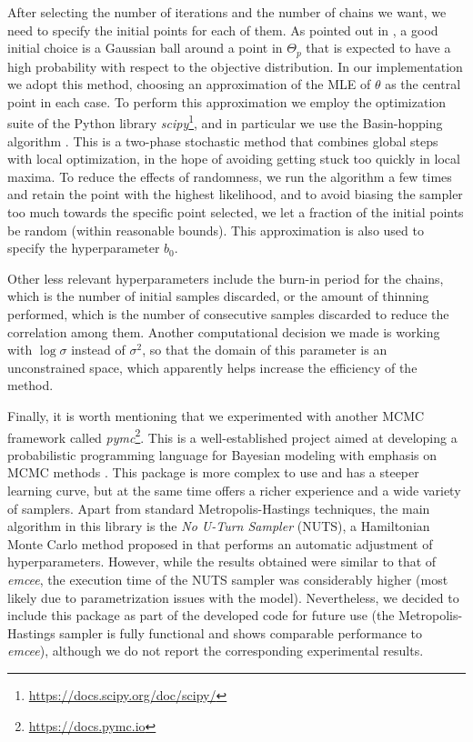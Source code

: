 After selecting the number of iterations and the number of chains we want, we need to specify the initial points for each of them. As pointed out in \citet{foreman2013emcee}, a good initial choice is a Gaussian ball around a point in \(\Theta_p\) that is expected to have a high probability with respect to the objective distribution. In our implementation we adopt this method, choosing an approximation of the MLE of \(\theta\) as the central point in each case. To perform this approximation we employ the optimization suite of the Python library \textit{scipy}\footnote{\url{https://docs.scipy.org/doc/scipy/}}, and in particular we use the Basin-hopping algorithm \citep{wales1997global}. This is a two-phase stochastic method that combines global steps with local optimization, in the hope of avoiding getting stuck too quickly in local maxima. To reduce the effects of randomness, we run the algorithm a few times and retain the point with the highest likelihood, and to avoid biasing the sampler too much towards the specific point selected, we let a fraction of the initial points be random (within reasonable bounds). This approximation is also used to specify the hyperparameter \(b_0\).

Other less relevant hyperparameters include the burn-in period for the chains, which is the number of initial samples discarded, or the amount of thinning performed, which is the number of consecutive samples discarded to reduce the correlation among them. Another computational decision we made is working with \(\log \sigma\) instead of \(\sigma^2\), so that the domain of this parameter is an unconstrained space, which apparently helps increase the efficiency of the method.

Finally, it is worth mentioning that we experimented with another MCMC framework called \textit{pymc}\footnote{\url{https://docs.pymc.io}}. This is a well-established project aimed at developing a probabilistic programming language for Bayesian modeling with emphasis on MCMC methods \citep{salvatier2016probabilistic}. This package is more complex to use and has a steeper learning curve, but at the same time offers a richer experience and a wide variety of samplers. Apart from standard Metropolis-Hastings techniques, the main algorithm in this library is the \textit{No U-Turn Sampler} (NUTS), a Hamiltonian Monte Carlo method proposed in \citet{hoffman2014no} that performs an automatic adjustment of hyperparameters. However, while the results obtained were similar to that of \textit{emcee}, the execution time of the NUTS sampler was considerably higher (most likely due to parametrization issues with the model). Nevertheless, we decided to include this package as part of the developed code for future use (the Metropolis-Hastings sampler is fully functional and shows comparable performance to \textit{emcee}), although we do not report the corresponding experimental results.

